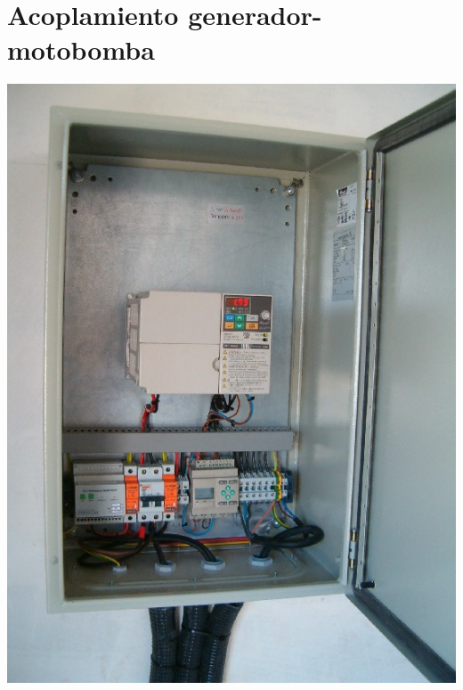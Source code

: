 \documentclass[xcolor={usenames,svgnames,dvipsnames}]{beamer}
\begin{document}
\section{Acoplamiento generador-motobomba}
\label{sec:orgb762edd}

\begin{frame}[label={sec:org6f7cb67}]{}
\begin{center}
\includegraphics[height=0.9\textheight]{../figs/VariadorFrecuencia.jpg}
\end{center}
\end{frame}
\end{document}
